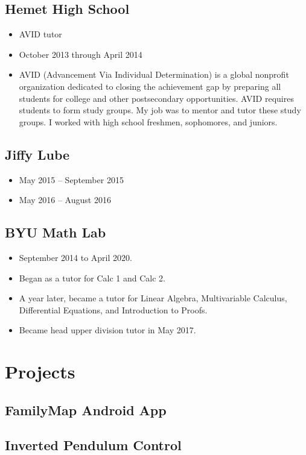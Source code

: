 \documentclass[11pt, letterpaper]{article}
\begin{document}
  \subsection*{Hemet High School}
    \begin{itemize}
      \item AVID tutor
      \item October 2013 through April 2014
      \item AVID (Advancement Via Individual Determination) is a global nonprofit organization dedicated to closing the achievement gap
        by preparing all students for college and other postsecondary opportunities.
        AVID requires students to form study groups.
        My job was to mentor and tutor these study groups.
        I worked with high school freshmen, sophomores, and juniors.
    \end{itemize}
  \subsection*{Jiffy Lube}
    \begin{itemize}
      \item May 2015 -- September 2015
      \item May 2016 -- August 2016
    \end{itemize}
  \subsection*{BYU Math Lab}
    \begin{itemize}
      \item September 2014 to April 2020.
      \item Began as a tutor for Calc 1 and Calc 2.
      \item A year later, became a tutor for Linear Algebra, Multivariable Calculus, Differential Equations, and Introduction to Proofs.
      \item Became head upper division tutor in May 2017.
    \end{itemize}
\section*{Projects}
  \subsection*{FamilyMap Android App}
  \subsection*{Inverted Pendulum Control}
\end{document}
